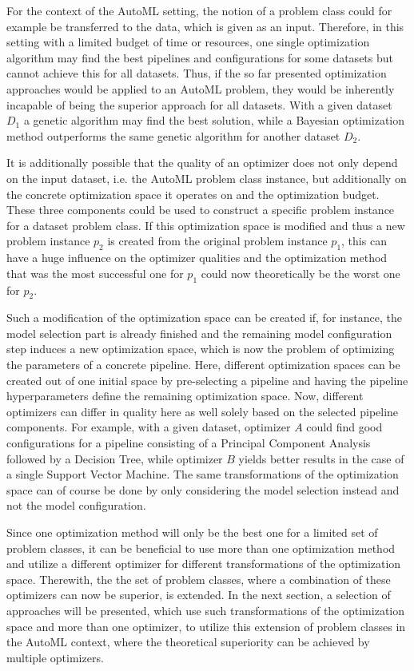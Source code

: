 For the context of the AutoML setting, the notion of a problem class could for example be transferred to the data, which is given as an input.
Therefore, in this setting with a limited budget of time or resources, one single optimization algorithm may find the best pipelines and configurations for some datasets but cannot achieve this for all datasets.
Thus, if the so far presented optimization approaches would be applied to an AutoML problem, they would be inherently incapable of being the superior approach for all datasets.
With a given dataset $D_1$ a genetic algorithm may find the best solution, while a Bayesian optimization method outperforms the same genetic algorithm for another dataset $D_2$.

It is additionally possible that the quality of an optimizer does not only depend on the input dataset, i.e. the AutoML problem class instance, but additionally on the concrete optimization space it operates on and the optimization budget.
These three components could be used to construct a specific problem instance for a dataset problem class.\newline
If this optimization space is modified and thus a new problem instance $p_2$ is created from the original problem instance $p_1$, this can have a huge influence on the optimizer qualities and the optimization method that was the most successful one for $p_1$ could now theoretically be the worst one for $p_2$.

Such a modification of the optimization space can be created if, for instance, the model selection part is already finished and the remaining model configuration step induces a new optimization space, which is now the problem of optimizing the parameters of a concrete pipeline.
Here, different optimization spaces can be created out of one initial space by pre-selecting a pipeline and having the pipeline hyperparameters define the remaining optimization space.\newline
Now, different optimizers can differ in quality here as well solely based on the selected pipeline components.
For example, with a given dataset, optimizer $A$ could find good configurations for a pipeline consisting of a Principal Component Analysis followed by a Decision Tree, while optimizer $B$ yields better results in the case of a single Support Vector Machine.
The same transformations of the optimization space can of course be done by only considering the model selection instead and not the model configuration.

Since one optimization method will only be the best one for a limited set of problem classes, it can be beneficial to use more than one optimization method and utilize a different optimizer for different transformations of the optimization space.
Therewith, the the set of problem classes, where a combination of these optimizers can now be superior, is extended.\newline
In the next section, a selection of approaches will be presented, which use such transformations of the optimization space and more than one optimizer, to utilize this extension of problem classes in the AutoML context, where the theoretical superiority can be achieved by multiple optimizers.

